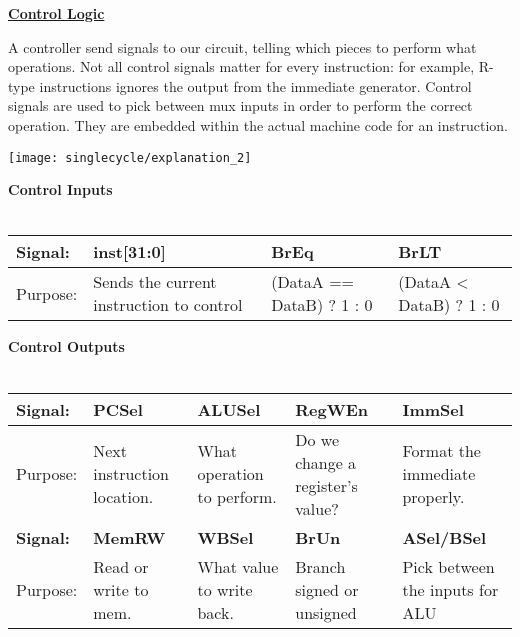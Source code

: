\begin{blocksection}
\question

\textbf{\underline{Control Logic}}

A controller send signals to our circuit, telling which pieces to perform what operations.  Not all control signals matter for every instruction: for example, R-type instructions ignores the output from the immediate generator.  Control signals are used to pick between mux inputs in order to perform the correct operation.  They are embedded within the actual machine code for an instruction.

\texttt{[image: singlecycle/explanation\_2]}

\textbf{Control Inputs}\\\\
\begin{tabular}{ |l|l|l|l| } 
 \hline
 \textbf{Signal:} & \textbf{inst[31:0]} & \textbf{BrEq} & \textbf{BrLT} \\ 
 \hline
 Purpose: & Sends the current instruction to control & (DataA == DataB) ? 1 : 0 & (DataA < DataB) ? 1 : 0 \\ 
 \hline
\end{tabular}

\textbf{Control Outputs}\\\\
\begin{tabular}{ |l|l|l|l|l| } 
 \hline
 \textbf{Signal:} & \textbf{PCSel} & \textbf{ALUSel} & \textbf{RegWEn} & \textbf{ImmSel} \\ 
 \hline
 Purpose: & Next instruction location. & What operation to perform. & Do we change a register’s value? & Format the immediate properly. \\ 
 \hline
 \textbf{Signal:} & \textbf{MemRW} & \textbf{WBSel} & \textbf{BrUn} & \textbf{ASel/BSel} \\
 \hline 
 Purpose: & Read or write to mem. & What value to write back. & Branch signed or unsigned & Pick between the inputs for ALU \\
 \hline
\end{tabular}

\end{blocksection}